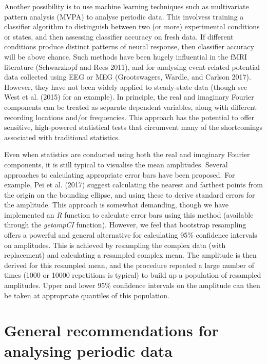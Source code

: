 \documentclass[]{article}
\begin{document}
Another possibility is to use machine learning techniques such as multivariate pattern analysis (MVPA) to analyse periodic data. This involvess training a classifier algorithm to distinguish between two (or more) experimental conditions or states, and then assessing classifier accuracy on fresh data. If different conditions produce distinct patterns of neural response, then classifier accuracy will be above chance. Such methods have been hugely influential in the fMRI literature (Schwarzkopf and Rees 2011), and for analysing event-related potential data collected using EEG or MEG (Grootswagers, Wardle, and Carlson 2017). However, they have not been widely applied to steady-state data (though see West et al. (2015) for an example). In principle, the real and imaginary Fourier components can be treated as separate dependent variables, along with different recording locations and/or frequencies. This approach has the potential to offer sensitive, high-powered statistical tests that circumvent many of the shortcomings associated with traditional statistics.

Even when statistics are conducted using both the real and imaginary Fourier components, it is still typical to visualise the mean amplitudes. Several approaches to calculating appropriate error bars have been proposed. For example, Pei et al. (2017) suggest calculating the nearest and farthest points from the origin on the bounding ellipse, and using these to derive standard errors for the amplitude. This approach is somewhat demanding, though we have implemented an \emph{R} function to calculate error bars using this method (available through the \emph{getampCI} function). However, we feel that bootstrap resampling offers a powerful and general alternative for calculating 95\% confidence intervals on amplitudes. This is achieved by resampling the complex data (with replacement) and calculating a resampled complex mean. The amplitude is then derived for this resampled mean, and the procedure repeated a large number of times (1000 or 10000 repetitions is typical) to build up a population of resampled amplitudes. Upper and lower 95\% confidence intervals on the amplitude can then be taken at appropriate quantiles of this population.

\hypertarget{general-recommendations-for-analysing-periodic-data}{%
\section{General recommendations for analysing periodic data}\label{general-recommendations-for-analysing-periodic-data}}
\end{document}
